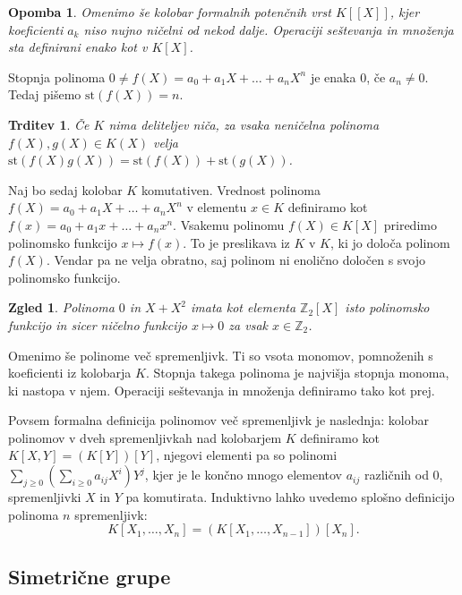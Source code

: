 \documentclass[10pt, a4paper]{article}
\newtheorem{trditev}[izr]{Trditev}
\newtheorem*{opomba}{Opomba}
\newtheorem{zgled}{Zgled}[section]
\newcommand{\Z}{\mathbb {Z}}
\begin{document}
\begin{opomba}
  Omenimo še kolobar formalnih potenčnih vrst $K[[X]]$, kjer koeficienti $a_k$ niso nujno ničelni od nekod dalje.
  Operaciji seštevanja in množenja sta definirani enako kot v $K[X]$.
\end{opomba}

Stopnja polinoma $0 \neq f(X) = a_0 + a_1 X + \dots + a_n X^n$ je enaka $0$, če $a_n \neq 0$.
Tedaj pišemo $\mathrm{st} (f(X)) = n$.

\begin{trditev}
  Če $K$ nima deliteljev niča, za vsaka neničelna polinoma $f(X), g(X) \in K(X)$ velja 
  $\mathrm{st}(f(X) g(X)) = \mathrm{st} (f(X)) + \mathrm{st} (g(X))$.
\end{trditev}

Naj bo sedaj kolobar $K$ komutativen. Vrednost polinoma $f(X) = a_0 + a_1 X + \dots + a_n X^n$
v elementu $x \in K$ definiramo kot $f(x) = a_0 + a_1 x + \dots + a_n x^n$.
Vsakemu polinomu $f(X) \in K[X]$ priredimo polinomsko funkcijo $x \mapsto f(x)$.
To je preslikava iz $K$ v $K$, ki jo določa polinom $f(X)$.
Vendar pa ne velja obratno, saj polinom ni enolično določen s svojo polinomsko funkcijo.

\begin{zgled}
  Polinoma $0$ in $X + X^2$ imata kot elementa $\Z_2[X]$ isto polinomsko funkcijo in sicer ničelno funkcijo 
  $x \mapsto 0$ za vsak $x \in \Z_2$. 
\end{zgled}

Omenimo še polinome več spremenljivk. Ti so vsota monomov, pomnoženih s koeficienti iz kolobarja $K$.
Stopnja takega polinoma je najvišja stopnja monoma, ki nastopa v njem.
Operaciji seštevanja in množenja definiramo tako kot prej.

Povsem formalna definicija polinomov več spremenljivk je naslednja: kolobar polinomov 
v dveh spremenljivkah nad kolobarjem $K$ definiramo kot $K[X, Y] = (K[Y])[Y]$, njegovi elementi pa so 
polinomi $\sum_{j \geq 0} \left(\sum_{i \geq 0} a_{ij} X^i\right)Y^j$, kjer je le končno mnogo elementov $a_{ij}$ različnih od $0$, spremenljivki $X$ in $Y$ pa komutirata.
Induktivno lahko uvedemo splošno definicijo polinoma $n$ spremenljivk:
$$K[X_1, \dots, X_n] = \left(K[X_1, \dots, X_{n - 1}]\right) [X_n].$$

\subsection{Simetrične grupe}
\end{document}
